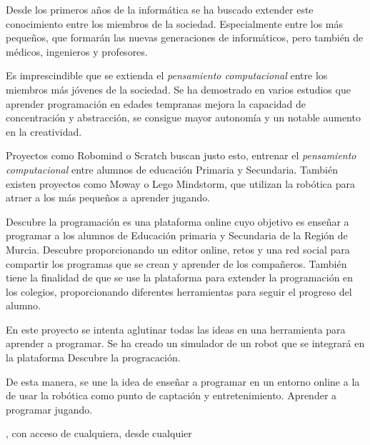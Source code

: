 Desde los primeros años de la informática se ha buscado extender este conocimiento entre los miembros de la sociedad. Especialmente entre los más pequeños, que formarán las nuevas generaciones de informáticos, pero también de médicos, ingenieros y profesores. 

Es imprescindible que se extienda el \emph{pensamiento computacional} entre los miembros más jóvenes de la sociedad. Se ha demostrado en varios estudios que aprender programación en edades tempranas mejora la capacidad de concentración y abstracción, se consigue mayor autonomía y un notable aumento en la creatividad.

Proyectos como Robomind o Scratch buscan justo esto, entrenar el \emph{pensamiento computacional} entre alumnos de educación Primaria y Secundaria. También existen proyectos como Moway o Lego Mindstorm, que utilizan la robótica para atraer a los más pequeños a aprender jugando. 

Descubre la programación es una plataforma online cuyo objetivo es enseñar a programar a los alumnos de Educación primaria y Secundaria de la Región de Murcia. Descubre proporcionando un editor online, retos y una red social para compartir los programas que se crean y aprender de los compañeros. También tiene la finalidad de que se use la plataforma para extender la programación en los colegios, proporcionando diferentes herramientas para seguir el progreso del alumno. 

En este proyecto se intenta aglutinar todas las ideas en una herramienta para aprender a programar. Se ha creado un simulador de un robot que se integrará en la plataforma Descubre la progracación.

De esta manera, se une la idea de enseñar a programar en un entorno online a la de usar la robótica como punto de captación y entretenimiento. Aprender a programar jugando.



, con acceso de cualquiera, desde cualquier 





























